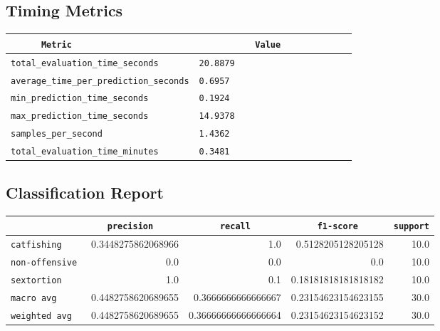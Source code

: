 \documentclass{article}
\begin{document}
\subsection{Timing Metrics}

\begin{center}
\begin{tabular}{l | l} \hline
    \verb|      Metric     | & \verb|           Value           | \\ \hline
    \hline
    \verb|total_evaluation_time_seconds| & \verb|20.8879                      | \\ \hline
    \verb|average_time_per_prediction_seconds| & \verb|0.6957                       | \\ \hline
    \verb|min_prediction_time_seconds| & \verb|0.1924                       | \\ \hline
    \verb|max_prediction_time_seconds| & \verb|14.9378                      | \\ \hline
    \verb|samples_per_second| & \verb|1.4362                       | \\ \hline
    \verb|total_evaluation_time_minutes| & \verb|0.3481                       | \\ \hline
\end{tabular}
\end{center}

\subsection{Classification Report}

\begin{center}
\begin{tabular}{l | r | r | r | r} \hline
    \verb|            | & \verb|    precision     | & \verb|      recall      | & \verb|     f1-score     | & \verb|support| \\ \hline
    \hline
    \verb|catfishing | & 0.3448275862068966 & 1.0 & 0.5128205128205128 &    10.0 \\ \hline
    \verb|non-offensive| & 0.0 & 0.0 & 0.0 &    10.0 \\ \hline
    \verb|sextortion | & 1.0 & 0.1 & 0.18181818181818182 &    10.0 \\ \hline
    \verb|macro avg  | & 0.4482758620689655 & 0.3666666666666667 & 0.23154623154623155 &    30.0 \\ \hline
    \verb|weighted avg| & 0.4482758620689655 & 0.36666666666666664 & 0.23154623154623152 &    30.0 \\ \hline
\end{tabular}
\end{center}
\end{document}
